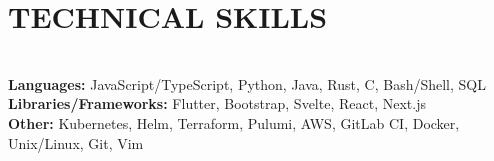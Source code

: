 \documentclass[12pt,letterpaper,roman]{moderncv}
\def \scaleFont {1.09} %
\def \headingSpace {-9mm * \real{\scaleFont}} %
\def \skillSpacing {1mm} %
\def \sectionSpacing {-12mm} %
\begin{document}
\section{TECHNICAL SKILLS} \leavevmode \\[\headingSpace]
\textbf{Languages:}
JavaScript/TypeScript,\hspace*{\skillSpacing}
Python,\hspace*{\skillSpacing}
Java,\hspace*{\skillSpacing}
Rust,\hspace*{\skillSpacing}
C,\hspace*{\skillSpacing}
Bash/Shell,\hspace*{\skillSpacing}
SQL\hspace*{\skillSpacing}
\\
\textbf{Libraries/Frameworks:}
Flutter,\hspace*{\skillSpacing}
Bootstrap,\hspace*{\skillSpacing}
Svelte,\hspace*{\skillSpacing}
React,\hspace*{\skillSpacing}
Next.js\hspace*{\skillSpacing}
\\
\textbf{Other:}
Kubernetes,\hspace*{\skillSpacing}
Helm,\hspace*{\skillSpacing}
Terraform,\hspace*{\skillSpacing}
Pulumi,\hspace*{\skillSpacing}
AWS,\hspace*{\skillSpacing}
GitLab CI,\hspace*{\skillSpacing}
Docker,\hspace*{\skillSpacing}
Unix/Linux,\hspace*{\skillSpacing}
Git,\hspace*{\skillSpacing}
Vim\hspace*{\skillSpacing}
\\[\sectionSpacing]
\end{document}

